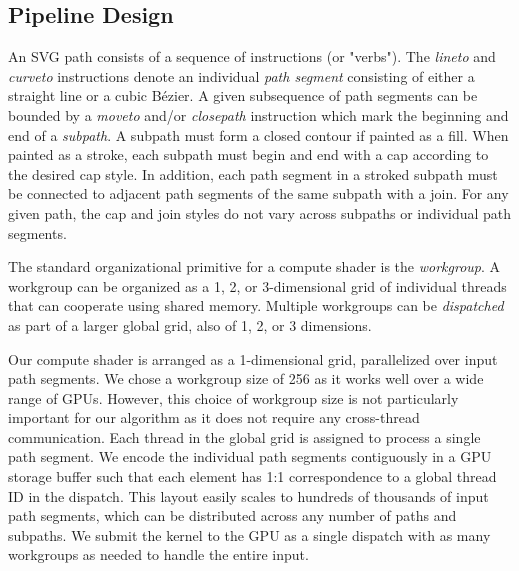 \documentclass[sigconf]{acmart}
\begin{document}

\subsection{Pipeline Design} \label{subsec:pipeline-design}

An SVG path consists of a sequence of instructions (or "verbs"). The \emph{lineto} and \emph{curveto} instructions denote an individual \emph{path segment} consisting of either a straight line or a cubic Bézier. A given subsequence of path segments can be bounded by a \emph{moveto} and/or \emph{closepath} instruction which mark the beginning and end of a \emph{subpath}. A subpath must form a closed contour if painted as a fill. When painted as a stroke, each subpath must begin and end with a cap according to the desired cap style. In addition, each path segment in a stroked subpath must be connected to adjacent path segments of the same subpath with a join. For any given path, the cap and join styles do not vary across subpaths or individual path segments.

The standard organizational primitive for a compute shader is the \emph{workgroup}. A workgroup can be organized as a 1, 2, or 3-dimensional grid of individual threads that can cooperate using shared memory. Multiple workgroups can be \emph{dispatched} as part of a larger global grid, also of 1, 2, or 3 dimensions.

Our compute shader is arranged as a 1-dimensional grid, parallelized over input path segments. We chose a workgroup size of 256 as it works well over a wide range of GPUs. However, this choice of workgroup size is not particularly important for our algorithm as it does not require any cross-thread communication. Each thread in the global grid is assigned to process a single path segment. We encode the individual path segments contiguously in a GPU storage buffer such that each element has 1:1 correspondence to a global thread ID in the dispatch. This layout easily scales to hundreds of thousands of input path segments, which can be distributed across any number of paths and subpaths. We submit the kernel to the GPU as a single dispatch with as many workgroups as needed to handle the entire input.
\end{document}
